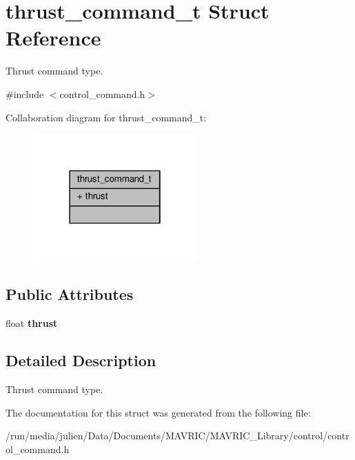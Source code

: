 \hypertarget{structthrust__command__t}{\section{thrust\+\_\+command\+\_\+t Struct Reference}
\label{structthrust__command__t}
}


Thrust command type.  




{\ttfamily \#include $<$control\+\_\+command.\+h$>$}



Collaboration diagram for thrust\+\_\+command\+\_\+t\+:
\nopagebreak
\begin{figure}[H]
\begin{center}
\leavevmode
\includegraphics[width=178pt]{structthrust__command__t__coll__graph}
\end{center}
\end{figure}
\subsection*{Public Attributes}
\begin{DoxyCompactItemize}
\item 
\hypertarget{structthrust__command__t_a4f6e284c1e8123078ea27d39f1aaac64}{float {\bfseries thrust}}\label{structthrust__command__t_a4f6e284c1e8123078ea27d39f1aaac64}

\end{DoxyCompactItemize}


\subsection{Detailed Description}
Thrust command type. 

The documentation for this struct was generated from the following file\+:\begin{DoxyCompactItemize}
\item 
/run/media/julien/\+Data/\+Documents/\+M\+A\+V\+R\+I\+C/\+M\+A\+V\+R\+I\+C\+\_\+\+Library/control/control\+\_\+command.\+h\end{DoxyCompactItemize}
